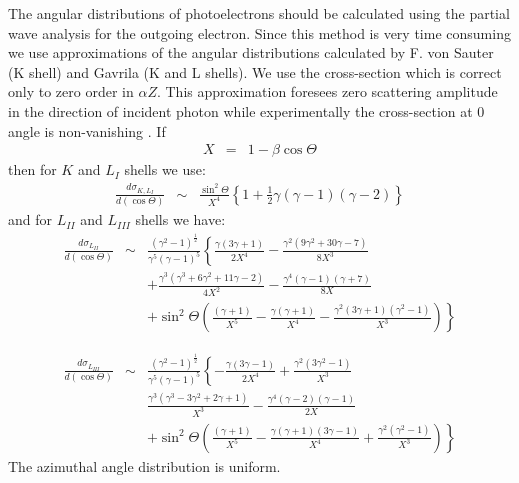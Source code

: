 The angular distributions of photoelectrons should be calculated using the
partial wave analysis for the outgoing electron. Since this method is very time
consuming we use approximations of the angular distributions calculated by
F. von Sauter \cite{bib-SAUTER1} \cite{bib-SAUTER2} (K shell) and Gavrila
\cite{bib-GAVRILA-K} \cite{bib-GAVRILA-L} 
(K and L shells). We use the cross-section
which is correct only to zero order in $\alpha Z$. This approximation foresees
zero scattering amplitude in the direction of incident photon while
experimentally the cross-section at $0$ angle is non-vanishing \cite{bib-NAGEL}.
If
\begin{eqnarray*}
           X &=& 1-\beta\cos\Theta
\end{eqnarray*}
then for $K$ and $L_I$ shells we use:
\begin{eqnarray}
           \frac{d\sigma_{K,L_{I}}}{d(\cos\Theta)}
           &\sim& \frac{\sin^2\Theta}{X^4}
                \left\{1+ \frac{1}{2}\gamma(\gamma-1)(\gamma-2)\right\}
\label{eq:angkl}
\end{eqnarray}
 and for $L_{II}$  and $L_{III}$ shells we have:
\begin{eqnarray}
 \frac{d\sigma_{L_{II}}}{d(\cos\Theta)}
           &\sim & \frac{(\gamma^2-1)^{\frac{1}{2}}}{\gamma^5(\gamma-1)^5}
           \left\{ \frac{\gamma(3\gamma+1)}{2 X^4}
      -\frac{\gamma^2(9\gamma^2+30\gamma-7)}{8 X^3} \right.  \nonumber \\
      \ & \ &      +\frac{\gamma^3(\gamma^3+6\gamma^2+11\gamma-2)}{4 X^2}
            -\frac{\gamma^4(\gamma-1)(\gamma+7)}{8 X} \\
         \ & \ &    +\sin^2\Theta
                  \left.    \left(
                         \frac{(\gamma+1)}{X^5}
                        -\frac{\gamma(\gamma+1)}{X^4}
                        -\frac{\gamma^2(3\gamma+1)(\gamma^2-1)}{X^3}
                      \right)
           \right\} \nonumber
\label{eq:angl2}
\end{eqnarray}
 
\begin{eqnarray}
           \frac{d\sigma_{L_{III}}}{d(\cos\Theta)}
           &\sim & \frac{(\gamma^2-1)^{\frac{1}{2}}}{\gamma^5(\gamma-1)^5}
           \left\{ -\frac{\gamma(3\gamma-1)}{2 X^4}
                   +\frac{\gamma^2(3\gamma^2-1)}{X^3} \right. \nonumber \\
        \ & \ & \frac{\gamma^3(\gamma^3-3\gamma^2+2\gamma+1)}{X^3}
                   -\frac{\gamma^4(\gamma-2)(\gamma-1)}{2 X} \\
        \ & \ & +\sin^2\Theta
                  \left.    \left(
                   \frac{(\gamma+1)}{X^5}
                  -\frac{\gamma(\gamma+1)(3\gamma-1)}{X^4}
                  +\frac{\gamma^2(\gamma^2-1)}{X^3}
                      \right)
           \right\} \nonumber
\label{eq:angl3}
\end{eqnarray}
The azimuthal angle distribution is uniform.
 
